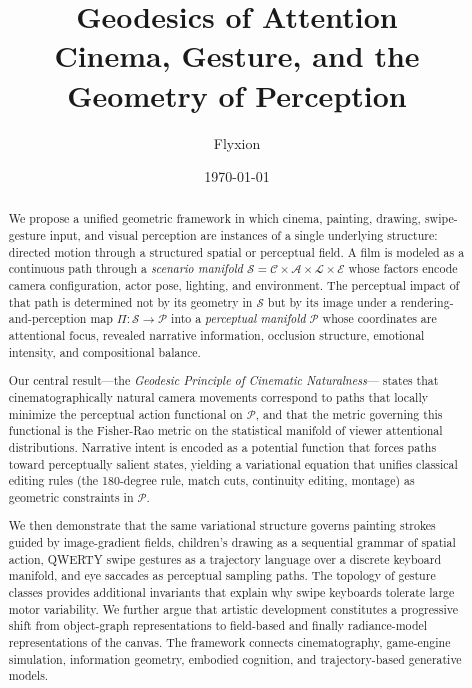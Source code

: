 \documentclass[12pt,a4paper]{article}
\title{\textbf{Geodesics of Attention}\\[4pt]
\large Cinema, Gesture, and the Geometry of Perception}
\author{Flyxion}
\date{\today}
\theoremstyle{plain}
\theoremstyle{definition}
\begin{document}
\maketitle
\thispagestyle{empty}

\begin{abstract}
We propose a unified geometric framework in which cinema, painting, drawing,
swipe-gesture input, and visual perception are instances of a single underlying
structure: directed motion through a structured spatial or perceptual field.
A film is modeled as a continuous path through a \emph{scenario manifold}
$\mathcal{S} = \mathcal{C}\times\mathcal{A}\times\mathcal{L}\times\mathcal{E}$
whose factors encode camera configuration, actor pose, lighting, and environment.
The perceptual impact of that path is determined not by its geometry in
$\mathcal{S}$ but by its image under a rendering-and-perception map
$\Pi:\mathcal{S}\to\mathcal{P}$ into a \emph{perceptual manifold} $\mathcal{P}$
whose coordinates are attentional focus, revealed narrative information,
occlusion structure, emotional intensity, and compositional balance.

Our central result---the \emph{Geodesic Principle of Cinematic Naturalness}---
states that cinematographically natural camera movements correspond to paths
that locally minimize the perceptual action functional on $\mathcal{P}$, and
that the metric governing this functional is the Fisher-Rao metric on the
statistical manifold of viewer attentional distributions. Narrative intent is
encoded as a potential function that forces paths toward perceptually salient
states, yielding a variational equation that unifies classical editing rules
(the 180-degree rule, match cuts, continuity editing, montage) as geometric
constraints in $\mathcal{P}$.

We then demonstrate that the same variational structure governs painting strokes
guided by image-gradient fields, children's drawing as a sequential grammar of
spatial action, QWERTY swipe gestures as a trajectory language over a discrete
keyboard manifold, and eye saccades as perceptual sampling paths. The topology
of gesture classes provides additional invariants that explain why swipe
keyboards tolerate large motor variability. We further argue that artistic
development constitutes a progressive shift from object-graph representations
to field-based and finally radiance-model representations of the canvas. The
framework connects cinematography, game-engine simulation, information geometry,
embodied cognition, and trajectory-based generative models.
\end{abstract}
\end{document}

